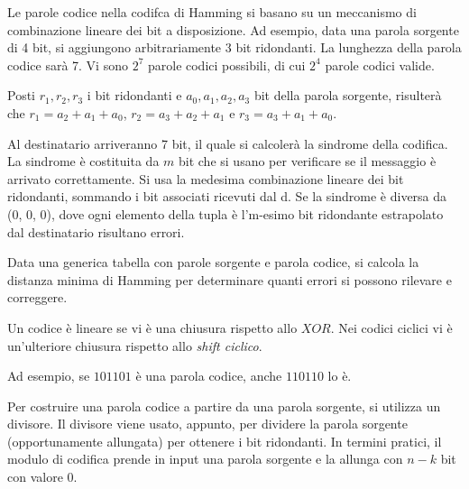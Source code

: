                 \vspace{3mm}
                
                Le parole codice nella codifca di Hamming si basano su un meccanismo di combinazione lineare dei bit a disposizione. Ad esempio, data una parola sorgente di 4 bit, si aggiungono arbitrariamente 3 bit ridondanti. La lunghezza della parola codice sarà 7. Vi sono $2^7$ parole codici possibili, di cui $2^4$ parole codici valide.
                
                Posti $r_1, r_2, r_3$ i bit ridondanti e $a_0, a_1, a_2, a_3$ bit della parola sorgente, risulterà che $r_1 = a_2 + a_1 + a_0$, $r_2 = a_3 + a_2 + a_1$ e $r_3 = a_3 + a_1 + a_0$.
                
                \vspace{3mm}
                
                Al destinatario arriveranno 7 bit, il quale si calcolerà la sindrome della codifica. La sindrome è costituita da $m$ bit che si usano per verificare se il messaggio è arrivato correttamente. Si usa la medesima combinazione lineare dei bit ridondanti, sommando i bit associati ricevuti dal d. Se la sindrome è diversa da (0, 0, 0), dove ogni elemento della tupla è l'm-esimo bit ridondante estrapolato dal destinatario risultano errori.
                
                \vspace{3mm}
                
                Data una generica tabella con parole sorgente e parola codice, si calcola la distanza minima di Hamming per determinare quanti errori si possono rilevare e correggere.
                
            
                Un codice è lineare se vi è una chiusura rispetto allo $XOR$. Nei codici ciclici vi è un'ulteriore chiusura rispetto allo \textit{shift ciclico}.
                
                Ad esempio, se $101101$ è una parola codice, anche $110110$ lo è.
                
                Per costruire una parola codice a partire da una parola sorgente, si utilizza un divisore. Il divisore viene usato, appunto, per dividere la parola sorgente (opportunamente allungata) per ottenere i bit ridondanti. In termini pratici, il modulo di codifica prende in input una parola sorgente e la allunga con $n-k$ bit con valore 0. 
                
